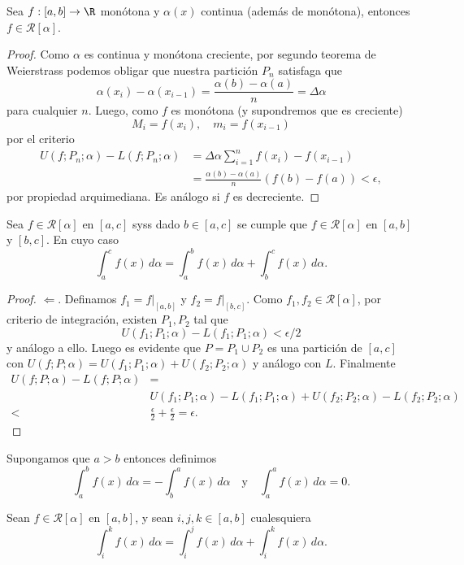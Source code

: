\documentclass[11pt,oneside,a4paper]{book}
\begin{document}
\begin{thm}
Sea $f:[a,b]\rightarrow\R$ monótona y $\alpha(x)$ continua (además de monótona), entonces $f\in\mathscr{R}[\alpha]$.
\end{thm}
\begin{proof}
Como $\alpha$ es continua y monótona creciente, por segundo teorema de Weierstrass podemos obligar que nuestra partición $P_n$ satisfaga que
$$\alpha(x_i)-\alpha(x_{i-1})=\frac{\alpha(b)-\alpha(a)}{n}=\Delta\alpha$$
para cualquier $n$. Luego, como $f$ es monótona (y supondremos que es creciente)
$$M_i=f(x_i),\quad m_i=f(x_{i-1})$$
por el criterio
\begin{align*}
U(f;P_n;\alpha)-L(f;P_n;\alpha)&=\Delta\alpha\sum_{i=1}^nf(x_i)-f(x_{i-1})\\
&=\frac{\alpha(b)-\alpha(a)}{n}(f(b)-f(a))\lt\epsilon,
\end{align*}
por propiedad arquimediana. Es análogo si $f$ es decreciente.
\end{proof}
\begin{thm}
Sea $f\in\mathscr{R}[\alpha]$ en $[a,c]$ syss dado $b\in[a,c]$ se cumple que $f\in\mathscr{R}[\alpha]$ en $[a,b]$ y $[b,c]$. En cuyo caso
\begin{equation}
\int_a^cf(x)\,d\alpha=\int_a^bf(x)\,d\alpha+\int_b^cf(x)\,d\alpha.
\end{equation}
\end{thm}
\begin{proof}
$\Longleftarrow$. Definamos $f_1=f|_{[a,b]}$ y $f_2=f|_{[b,c]}$. Como $f_1,f_2\in\mathscr{R}[\alpha]$, por criterio de integración, existen $P_1,P_2$ tal que
$$U(f_1;P_1;\alpha)-L(f_1;P_1;\alpha)\lt\epsilon/2$$
y análogo a ello. Luego es evidente que $P=P_1\cup P_2$ es una partición de $[a,c]$ con $U(f;P;\alpha)=U(f_1;P_1;\alpha)+U(f_2;P_2;\alpha)$ y análogo con $L$. Finalmente
\begin{align*}
U(f;P;\alpha)-L(f;P;\alpha)&=\\&U(f_1;P_1;\alpha)-L(f_1;P_1;\alpha)+U(f_2;P_2;\alpha)-L(f_2;P_2;\alpha)\\
\lt&\frac{\epsilon}{2}+\frac{\epsilon}{2}=\epsilon.
\end{align*}
\end{proof}
\begin{mydef}
Supongamos que $a\gt b$ entonces definimos
$$\int_a^bf(x)\,d\alpha=-\int_b^af(x)\,d\alpha\quad\text{y}\quad\int_a^af(x)\,d\alpha=0.$$
\end{mydef}
\begin{cor}
Sean $f\in\mathscr{R}[\alpha]$ en $[a,b]$, y sean $i,j,k\in[a,b]$ cualesquiera
$$\int_i^kf(x)\,d\alpha=\int_i^jf(x)\,d\alpha+\int_i^kf(x)\,d\alpha.$$
\end{cor}
\end{document}
